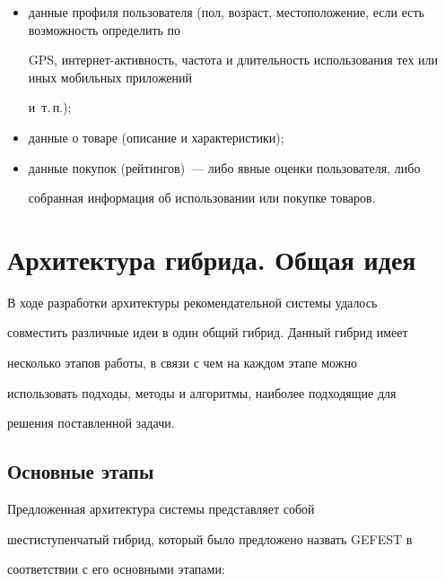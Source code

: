 \begin{itemize}


   \item данные профиля пользователя (пол, возраст, местоположение, если есть возможность определить по 


   GPS, ин\-тер\-нет-ак\-тив\-ность,  частота и длительность использования тех или иных мобильных приложений 


   и~т.\,п.);


\item данные о товаре (описание и характеристики); 


\item данные покупок (рейтингов)~--- либо явные оценки пользователя, либо


собранная информация об использовании или покупке товаров.


\end{itemize}





\section{Архитектура гибрида. Общая идея}





В ходе разработки архитектуры рекомендательной системы удалось


со\-вмес\-тить различные идеи в один общий гибрид. Данный гибрид имеет


несколько этапов работы, в связи с чем на каждом этапе можно


использовать подходы, методы и алгоритмы, наиболее подходящие для


решения поставленной задачи.





\subsection{Основные этапы}





Предложенная архитектура системы представляет собой


шестиступенчатый гибрид, который было предложено назвать GEFEST в


соответствии с его основными этапами:


